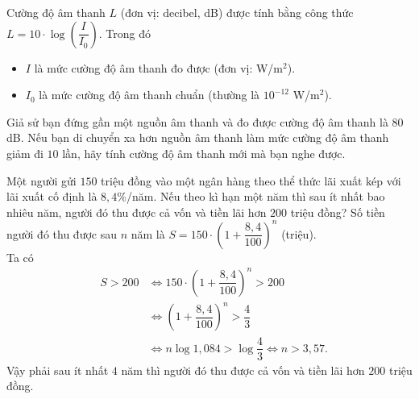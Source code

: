 \begin{bt}%

	Cường độ âm thanh $L$ (đơn vị: decibel, dB) được tính bằng công thức \break $L=10\cdot\log\left(\dfrac{I}{I_0}\right)$.	Trong đó
	\begin{itemize}
		\item $I$ là mức cường độ âm thanh đo được (đơn vị: W/m$^2$).
		\item $I_0$ là mức cường độ âm thanh chuẩn (thường là $10^{-12}$ W/m$^2$).
	\end{itemize}
	Giả sử bạn đứng gần một nguồn âm thanh và đo được cường độ âm thanh là $80$ dB. Nếu bạn di chuyển xa hơn nguồn âm thanh làm mức cường độ âm thanh giảm đi $10$ lần, hãy tính cường độ âm thanh mới mà bạn nghe được.
\end{bt}

\begin{bt}%

	Một người gửi $150$ triệu đồng vào một ngân hàng theo thể thức lãi xuất kép với lãi xuất cố định là $8{,}4\%$/năm. Nếu theo kì hạn một năm thì sau ít nhất bao nhiêu năm, người đó thu được cả vốn và tiền lãi hơn $200$ triệu đồng?
	\loigiai
	{
	Số tiền người đó thu được sau $n$ năm là $S=150\cdot{\left(1+\dfrac{8{,}4}{100}\right)^n}$ (triệu).\\
	Ta có
		\begin{eqnarray*}
			&  S>200 &\Leftrightarrow 150 \cdot{\left(1+\dfrac{8{,}4}{100}\right)^n}>200\\
			& &\Leftrightarrow {\left(1+\dfrac{8{,}4}{100}\right)^n}>\dfrac{4}{3}\\
			& &\Leftrightarrow n\log 1{,}084>\log \dfrac{4}{3}\Leftrightarrow n>3{,}57.
		\end{eqnarray*}
	Vậy phải sau ít nhất $4$ năm thì người đó thu được cả vốn và tiền lãi hơn $200$ triệu đồng.
}
\end{bt}


